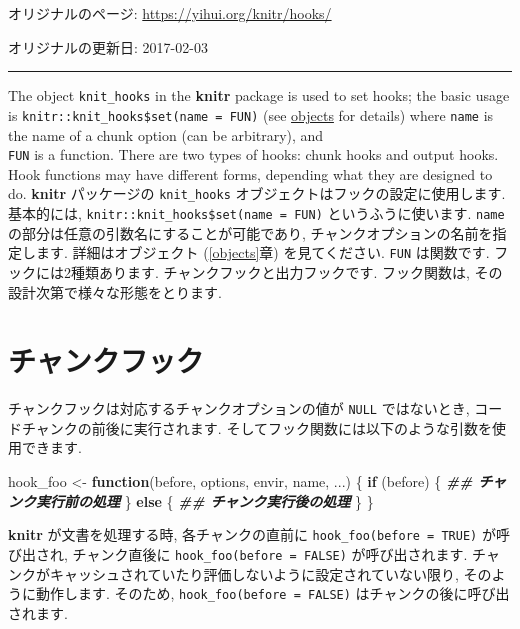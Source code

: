 \documentclass[
  lualatex,ja=standard,jafont=noto-otf]{bxjsreport}
\newenvironment{Shaded}{\begin{snugshade}}{\end{snugshade}}
\newcommand{\ControlFlowTok}[1]{\textcolor[rgb]{0.13,0.29,0.53}{\textbf{#1}}}
\newcommand{\DocumentationTok}[1]{\textcolor[rgb]{0.56,0.35,0.01}{\textbf{\textit{#1}}}}
\newcommand{\NormalTok}[1]{#1}
\newcommand{\OtherTok}[1]{\textcolor[rgb]{0.56,0.35,0.01}{#1}}
\begin{document}
オリジナルのページ: \url{https://yihui.org/knitr/hooks/}

オリジナルの更新日: 2017-02-03

\begin{center}\rule{0.5\linewidth}{0.5pt}\end{center}

The object \texttt{knit\_hooks} in the \textbf{knitr} package is used to
set hooks; the basic usage is
\texttt{knitr::knit\_hooks\$set(name\ =\ FUN)} (see
\href{../objects/}{objects} for details) where \texttt{name} is the name
of a chunk option (can be arbitrary), and\\
\texttt{FUN} is a function. There are two types of hooks: chunk hooks
and output hooks. Hook functions may have different forms, depending
what they are designed to do. \textbf{knitr} パッケージの
\texttt{knit\_hooks} オブジェクトはフックの設定に使用します. 基本的には,
\texttt{knitr::knit\_hooks\$set(name\ =\ FUN)} というふうに使います.
\texttt{name} の部分は任意の引数名にすることが可能であり,
チャンクオプションの名前を指定します. 詳細はオブジェクト
(\ref{objects}章) を見てください. \texttt{FUN} は関数です.
フックには2種類あります. チャンクフックと出力フックです. フック関数は,
その設計次第で様々な形態をとります.

\hypertarget{ux30c1ux30e3ux30f3ux30afux30d5ux30c3ux30af}{%
\section{チャンクフック}\label{ux30c1ux30e3ux30f3ux30afux30d5ux30c3ux30af}}

チャンクフックは対応するチャンクオプションの値が \texttt{NULL}
ではないとき, コードチャンクの前後に実行されます.
そしてフック関数には以下のような引数を使用できます.

\begin{Shaded}
\begin{Highlighting}[numbers=left,,]
\NormalTok{hook\_foo }\OtherTok{\textless{}{-}} \ControlFlowTok{function}\NormalTok{(before, options, envir, name, ...) \{}
  \ControlFlowTok{if}\NormalTok{ (before) \{}
    \DocumentationTok{\#\# チャンク実行前の処理}
\NormalTok{  \} }\ControlFlowTok{else}\NormalTok{ \{}
    \DocumentationTok{\#\# チャンク実行後の処理}
\NormalTok{  \}}
\NormalTok{\}}
\end{Highlighting}
\end{Shaded}

\textbf{knitr} が文書を処理する時, 各チャンクの直前に
\texttt{hook\_foo(before\ =\ TRUE)} が呼び出され, チャンク直後に
\texttt{hook\_foo(before\ =\ FALSE)} が呼び出されます.
チャンクがキャッシュされていたり評価しないように設定されていない限り,
そのように動作します. そのため, \texttt{hook\_foo(before\ =\ FALSE)}
はチャンクの後に呼び出されます.
\end{document}
